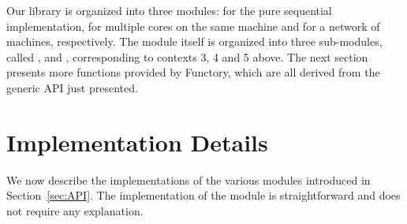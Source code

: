 \documentclass[tfpsymp,pagenumbers]{tfp07symp}
\newcommand{\functory}{\textsf{Functory}}
\begin{document}
Our library is organized into three modules:  for the
pure sequential implementation,  for multiple cores on the
same machine and  for a network of machines, respectively.
The  module itself is organized into three sub-modules,
called ,  and ,
corresponding to contexts 3, 4 and 5 above. 
The next section presents more functions provided by \functory, which
are all derived from the generic API just presented.




\section{Implementation Details}\label{sec:implem}

We now describe the implementations of the various modules introduced
in Section~\ref{sec:API}. The implementation of the 
module is straightforward and does not require any explanation.
\end{document}
